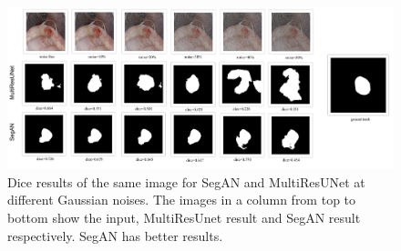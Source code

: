 \begin{figure}
    \centerline{\includegraphics[width=1\columnwidth]{05-results/figures/extended_results_sample_gan_over_unet.png}}
    \caption{Dice results of the same image for SegAN and MultiResUNet at different Gaussian noises. The images in a column from top to bottom show the input, MultiResUnet result and SegAN result respectively. SegAN has better results.}
    \label{fig:all-noises-with-results-dice-segan-over-multiresunet}
\end{figure}
